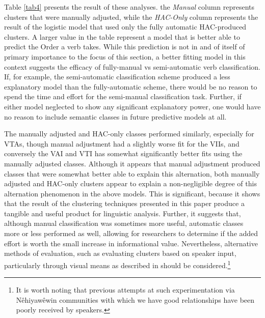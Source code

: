 Table \ref{tab4} presents the result of these analyses. the \textit{Manual} column represents clusters that were manually adjusted, while the \textit{HAC-Only} column represents the result of the logistic model that used only the fully automatic HAC-produced clusters. A larger value in the table represent a model that is better able to predict the Order a verb takes. While this prediction is not in and of itself of primary importance to the focus of this section, a better fitting model in this context suggests the efficacy of fully-manual vs semi-automatic verb classification. If, for example, the semi-automatic classification scheme produced a less explanatory model than the fully-automatic scheme, there would be no reason to spend the time and effort for the semi-manual classification task. Further, if either model neglected to show any significant explanatory power, one would have no reason to include semantic classes in future predictive models at all.

The manually adjusted and HAC-only classes performed similarly, especially for VTAs, though manual adjustment had a slightly worse fit for the VIIs, and conversely the VAI and VTI has somewhat significantly better fits using the manually adjusted classes. Although it appears that manual adjustment produced classes that were somewhat better able to explain this alternation, both manually adjusted and HAC-only clusters appear to explain a non-negligible degree of this alternation phenomenon in the above models. This is significant, because it shows that the result of the clustering techniques presented in this paper produce a tangible and useful product for linguistic analysis. Further, it suggests that, although manual classification was sometimes more useful, automatic classes more or less performed as well, allowing for researchers to determine if the added effort is worth the small increase in informational value. Nevertheless, alternative methods of evaluation, such as evaluating clusters based on speaker input, particularly through visual means as described in \citet{majewska2020manual} should be considered.\footnote{It is worth noting that previous attempts at such experimentation via Nêhiyawêwin communities with which we have good relationships have been poorly received by speakers.}


\FloatBarrier

